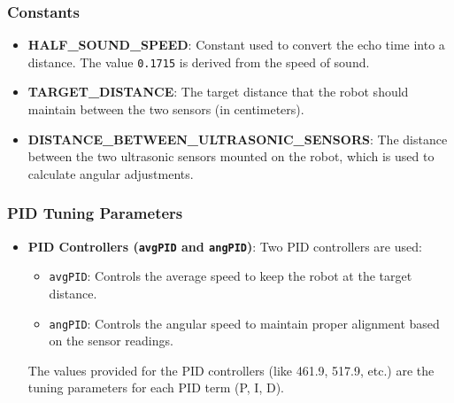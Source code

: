 \documentclass[a4paper,12pt]{./article}
\begin{document}
\subsubsection{Constants}
\begin{itemize}
\item \textbf{HALF\_SOUND\_SPEED}: Constant used to convert the echo time into a distance. The value \texttt{0.1715} is derived from the speed of sound.
\item \textbf{TARGET\_DISTANCE}: The target distance that the robot should maintain between the two sensors (in centimeters).
\item \textbf{DISTANCE\_BETWEEN\_ULTRASONIC\_SENSORS}: The distance between the two ultrasonic sensors mounted on the robot, which is used to calculate angular adjustments.
\end{itemize}
\subsubsection{PID Tuning Parameters}
\begin{itemize}
\item \textbf{PID Controllers (\texttt{avgPID} and \texttt{angPID})}: Two PID controllers are used:
\begin{itemize}
\item \texttt{avgPID}: Controls the average speed to keep the robot at the target distance.
\item \texttt{angPID}: Controls the angular speed to maintain proper alignment based on the sensor readings.
\end{itemize}
The values provided for the PID controllers (like 461.9, 517.9, etc.) are the tuning parameters for each PID term (P, I, D).
\end{itemize}
\end{document}
